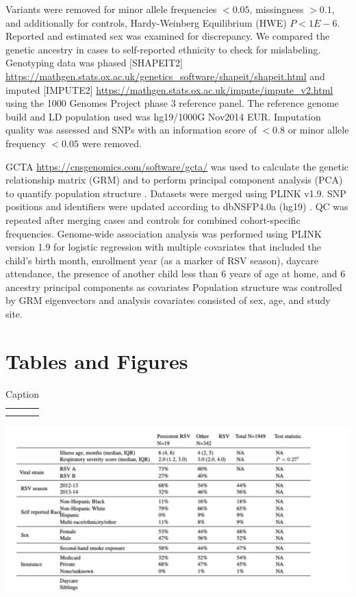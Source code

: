 \documentclass{article}
\begin{document}
Variants were removed for minor allele frequencies $<0.05$, missingness $>0.1$, 
and additionally for controls, Hardy-Weinberg Equilibrium (HWE) $P <1E-6$.
Reported and estimated sex was examined for discrepancy. 
We compared the genetic ancestry in cases to self-reported ethnicity to check for mislabeling. 
Genotyping data was phased 
[SHAPEIT2]
\url{https://mathgen.stats.ox.ac.uk/genetics_software/shapeit/shapeit.html}
and imputed 
[IMPUTE2] 
\url{https://mathgen.stats.ox.ac.uk/impute/impute_v2.html}
using the 1000 Genomes Project phase 3 reference panel. 
The reference genome build and LD population used was hg19/1000G Nov2014 EUR. 
Imputation quality was assessed and SNPs with an information score of $<0.8$ or minor allele frequency $<0.05$ were removed.

GCTA \url{https://cnsgenomics.com/software/gcta/}
was used to calculate the genetic relationship matrix (GRM) and to 
perform principal component analysis (PCA) 
to quantify population structure 
\cite{yang_gcta_2011}. 
Datasets were merged using PLINK v1.9. SNP positions and identifiers were 
updated according to dbNSFP4.0a (hg19) 
\cite{liu_dbnsfp_2016}.
QC was repeated after merging cases and controls for combined cohort-specific 
frequencies. 
Genome-wide association analysis was performed using PLINK version 1.9 for logistic regression with multiple covariates that included the child’s birth month, enrollment year (as a marker of RSV season), daycare attendance, the presence of another child less than 6 years of age at home, and 6 ancestry principal components as covariates
Population structure was controlled by GRM eigenvectors and analysis covariates consisted of sex, age, and study site.





\section{Tables and Figures}
\begin{table}[h]
    \centering
    \begin{tabular}{c|c}
         &  \\
         & 
    \end{tabular}
        \includegraphics[scale=0.6]{t1}
    \caption{Caption}
    \label{tab:1}
\end{table}
\end{document}
